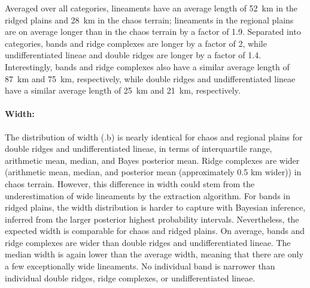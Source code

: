 Averaged over all categories, lineaments have an average length of 52~km in the ridged plains and 28~km in the chaos terrain; lineaments in the regional plains are on average longer than in the chaos terrain by a factor of 1.9. Separated into categories, bands and ridge complexes are longer by a factor of 2, while undifferentiated lineae and double ridges are longer by a factor of 1.4. Interestingly, bands and ridge complexes also have a similar average length of 87~km and 75~km, respectively, while double ridges and undifferentiated lineae have a similar average length of 25~km and 21~km, respectively.


\paragraph{Width:} The distribution of width (.b) is nearly identical for chaos and regional plains for double ridges and undifferentiated lineae, in terms of interquartile range, arithmetic mean, median, and Bayes posterior mean. Ridge complexes are wider (arithmetic mean, median, and posterior mean (approximately 0.5 km wider)) in chaos terrain. However, this difference in width could stem from the underestimation of wide lineaments by the extraction algorithm. For bands in ridged plains, the width distribution is harder to capture with Bayesian inference, inferred from the larger posterior highest probability intervals. Nevertheless, the expected width is comparable for chaos and ridged plains. 
On average, bands and ridge complexes are wider than double ridges and undifferentiated lineae. The median width is again lower than the average width, meaning that there are only a few exceptionally wide lineaments. No individual band is narrower than individual double ridges, ridge complexes, or undifferentiated lineae. 


